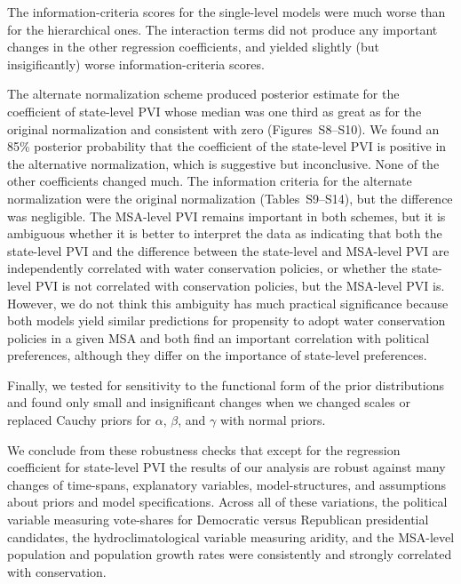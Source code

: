 \documentclass[draft,linenumbers]{agujournal}\usepackage{knitr}
\begin{document}
The information-criteria scores for the single-level models were much
worse than for the hierarchical ones.
The interaction terms did not produce any
important changes in the other regression coefficients, and yielded
slightly (but insigificantly) worse information-criteria scores.

The alternate normalization scheme produced posterior estimate for the
coefficient of state-level PVI whose median was one third as great as for the original
normalization and consistent with zero (Figures~S8--S10).
We found an 85\% posterior probability that the coefficient of the state-level PVI
is positive in the alternative normalization, which is suggestive but inconclusive.
None of the other coefficients changed much.
The information criteria for the alternate normalization were
%
the original normalization (Tables~S9--S14),
%
{but the difference was negligible. The}
MSA-level PVI remains important in both schemes,
but it is ambiguous whether it is
better to interpret the data as indicating that both the state-level PVI
and the difference between the state-level and MSA-level PVI are independently
correlated with water conservation policies, or whether the state-level PVI
is not correlated with conservation policies, but the MSA-level PVI is.
However, we do not think this ambiguity has much practical significance
because both models yield similar predictions for propensity to adopt
water conservation policies in a given MSA and both find an important
correlation with political preferences, although they differ on the importance
of state-level preferences.

Finally, we tested for sensitivity to the functional form of the prior
distributions and found only small and insignificant changes when we
changed scales or replaced Cauchy priors for $\alpha$, $\beta$, and
$\gamma$ with normal priors.

We conclude from these robustness checks that
except for the regression coefficient for state-level PVI
the results
of our analysis are robust against many changes of time-spans,
explanatory variables, model-structures, and assumptions about priors
and model specifications.
Across all of these variations, the political variable measuring
vote-shares for Democratic versus Republican presidential candidates,
the hydroclimatological variable measuring aridity, and the
MSA-level population and population growth rates were
consistently and strongly correlated with conservation.
\end{document}
